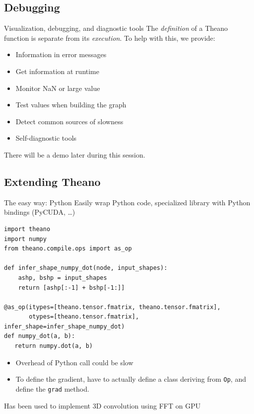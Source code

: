 \documentclass[a4paper,9pt]{beamer}
\begin{document}
\subsection{Debugging}
\begin{frame}[fragile]{Visualization, debugging, and diagnostic tools}
  The \emph{definition} of a Theano function is separate from its \emph{execution}.
  To help with this, we provide:
  \begin{itemize}
    \item Information in error messages
    \item Get information at runtime
    \item Monitor NaN or large value
    \item Test values when building the graph
    \item Detect common sources of slowness
    \item Self-diagnostic tools
  \end{itemize}
  There will be a demo later during this session.
\end{frame}

\subsection{Extending Theano}

\begin{frame}[fragile]{The easy way: Python}
\small
  Easily wrap Python code, specialized library with Python bindings (PyCUDA, \ldots)

  \begin{verbatim}
import theano
import numpy
from theano.compile.ops import as_op

def infer_shape_numpy_dot(node, input_shapes):
    ashp, bshp = input_shapes
    return [ashp[:-1] + bshp[-1:]]

@as_op(itypes=[theano.tensor.fmatrix, theano.tensor.fmatrix],
       otypes=[theano.tensor.fmatrix], infer_shape=infer_shape_numpy_dot)
def numpy_dot(a, b):
   return numpy.dot(a, b)

  \end{verbatim}
  \begin{itemize}
    \item Overhead of Python call could be slow
    \item To define the gradient, have to actually define a class deriving from \verb|Op|,
      and define the \verb|grad| method.
  \end{itemize}
  Has been used to implement 3D convolution using FFT on GPU
\end{frame}
\end{document}
